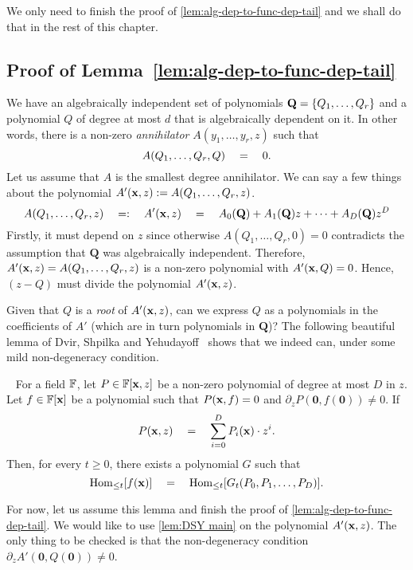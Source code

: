 We only need to finish the proof of \autoref{lem:alg-dep-to-func-dep-tail} and we shall do that in the rest of this chapter. 

\subsection{Proof of Lemma~\ref{lem:alg-dep-to-func-dep-tail}}

We have an algebraically independent set of polynomials $\mathbf{Q} = \left\{Q_1,\ldots, Q_r\right\}$ and a polynomial $Q$ of degree at most $d$ that is algebraically dependent on it.
In other words, there is a non-zero \emph{annihilator} $A(y_1,\ldots, y_r,z)$ such that
\[
A(Q_1,\ldots, Q_r, Q) \quad = \quad0. 
\]
Let us assume that $A$ is the smallest degree annihilator.
We can say a few things about the polynomial $A'(\mathbf{x},z) := A(Q_1,\ldots, Q_r, z)$.
\[
A(Q_1,\ldots, Q_r,z) \quad =: \quad A'(\mathbf{x}, z) \quad = \quad A_0(\mathbf{Q}) + A_1(\mathbf{Q}) z + \cdots + A_D(\mathbf{Q}) z^D
\]
Firstly, it must depend on $z$ since otherwise $A(Q_1,\ldots, Q_r,0) = 0$ contradicts the assumption that $\mathbf{Q}$ was algebraically independent.
Therefore, $A'(\mathbf{x}, z) = A(Q_1,\ldots, Q_r,z)$ is a non-zero polynomial with $A'(\mathbf{x}, Q) = 0$.
Hence, $(z - Q)$ must divide the polynomial $A'(\mathbf{x},z)$.

Given that $Q$ is a \emph{root} of $A'(\mathbf{x}, z)$, can we express $Q$ as a polynomials in the coefficients of $A'$ (which are in turn polynomials in $\mathbf{Q}$)? The following beautiful lemma of Dvir, Shpilka and Yehudayoff~\cite{DSY09} shows that we indeed can, under some mild non-degeneracy condition. 

\begin{lemma}~\label{lem:DSY main}
For a field $\mathbb{F}$, let $P \in \mathbb{F}[\mathbf{x}, z]$ be a non-zero polynomial of degree at most $D$ in $z$. Let $f \in \mathbb{F}[\mathbf{x}]$ be a polynomial such that $P(\mathbf{x}, f) = 0$ and $\partial_zP(\mathbf{0}, f(\mathbf{0}))\neq 0$. If 
\[
P(\mathbf{x}, z) \quad = \quad \sum_{i = 0}^D P_i(\mathbf{x})\cdot z^i.
\] 
Then, for every $t \geq 0$, there exists a polynomial $G$ such that 
\[
\operatorname{Hom}_{\leq t}[f(\mathbf{x})] \quad = \quad \operatorname{Hom}_{\leq t}[G_t(P_0, P_1, \ldots, P_D)].
\]
\end{lemma} 

\noindent
For now, let us assume this lemma and finish the proof of \autoref{lem:alg-dep-to-func-dep-tail}. We would like to use \autoref{lem:DSY main} on the polynomial $A'(\mathbf{x}, z)$. The only thing to be checked is that the non-degeneracy condition $\partial_zA' (\mathbf{0}, Q(\mathbf{0})) \neq 0$. 

